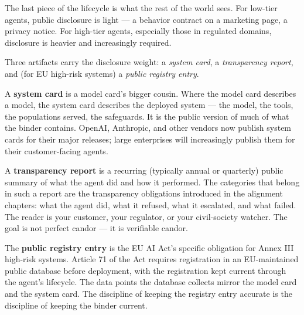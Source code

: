The last piece of the lifecycle is what the rest of the world sees. For low-tier agents, public disclosure is light --- a behavior contract on a marketing page, a privacy notice. For high-tier agents, especially those in regulated domains, disclosure is heavier and increasingly required.

Three artifacts carry the disclosure weight: a \textit{system card}, a \textit{transparency report}, and (for EU high-risk systems) a \textit{public registry entry}.

A \textbf{system card} is a model card's bigger cousin. Where the model card describes a model, the system card describes the deployed system --- the model, the tools, the populations served, the safeguards. It is the public version of much of what the binder contains. OpenAI, Anthropic, and other vendors now publish system cards for their major releases; large enterprises will increasingly publish them for their customer-facing agents.

A \textbf{transparency report} is a recurring (typically annual or quarterly) public summary of what the agent did and how it performed. The categories that belong in such a report are the transparency obligations introduced in the alignment chapters: what the agent did, what it refused, what it escalated, and what failed. The reader is your customer, your regulator, or your civil-society watcher. The goal is not perfect candor --- it is verifiable candor.

The \textbf{public registry entry} is the EU AI Act's specific obligation for Annex III high-risk systems. Article 71 of the Act requires registration in an EU-maintained public database before deployment, with the registration kept current through the agent's lifecycle. The data points the database collects mirror the model card and the system card. The discipline of keeping the registry entry accurate is the discipline of keeping the binder current.

